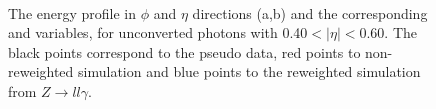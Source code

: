 \begin{figure}[ht]
    \centering
	 \\
    \caption{The energy profile in $\phi$ and $\eta$ directions (a,b) and the corresponding \Rphi and \Reta variables, for unconverted photons with 0.40$<|\eta|<$0.60. The black points correspond to the pseudo data, red points to non-reweighted simulation and blue points to the reweighted simulation from $Z\rightarrow ll\gamma$.}
    \label{fig:gamma:ss:reweighting:photon:closure}
\end{figure}
